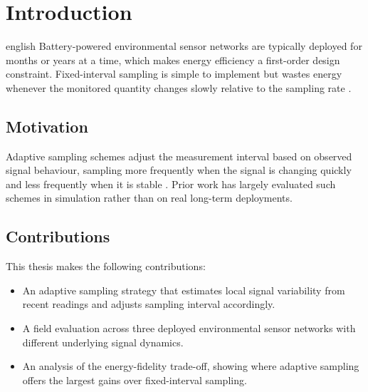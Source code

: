 \chapter{Introduction}
\label{chap-introduction}

\begin{otherlanguage*}{english}
Battery-powered environmental sensor networks are typically deployed for
months or years at a time, which makes energy efficiency a first-order
design constraint. Fixed-interval sampling is simple to implement but
wastes energy whenever the monitored quantity changes slowly relative to
the sampling rate \citep{Alippi2008}.

\section{Motivation}
Adaptive sampling schemes adjust the measurement interval based on observed
signal behaviour, sampling more frequently when the signal is changing
quickly and less frequently when it is stable \citep{Jain2004}. Prior work
has largely evaluated such schemes in simulation rather than on real
long-term deployments.

\section{Contributions}
This thesis makes the following contributions:
\begin{itemize}
  \item An adaptive sampling strategy that estimates local signal
    variability from recent readings and adjusts sampling interval
    accordingly.
  \item A field evaluation across three deployed environmental sensor
    networks with different underlying signal dynamics.
  \item An analysis of the energy-fidelity trade-off, showing where
    adaptive sampling offers the largest gains over fixed-interval
    sampling.
\end{itemize}
\end{otherlanguage*}
